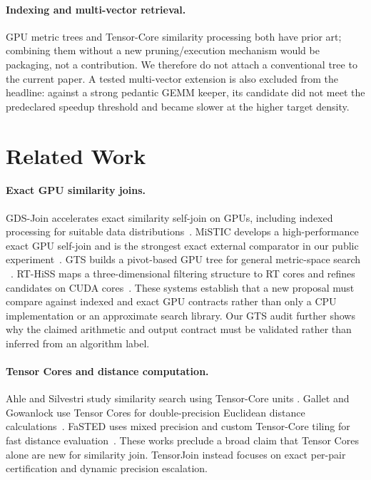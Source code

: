 \documentclass[sigconf,review,anonymous]{acmart}
\newcommand{\system}{TensorJoin\xspace}
\begin{document}
\paragraph{Indexing and multi-vector retrieval.}
GPU metric trees and Tensor-Core similarity processing both have prior art;
combining them without a new pruning/execution mechanism would be packaging,
not a contribution.  We therefore do not attach a conventional tree to the
current paper.  A tested multi-vector extension is also excluded from the
headline: against a strong pedantic GEMM keeper, its candidate did not meet the
predeclared speedup threshold and became slower at the higher target density.

\section{Related Work}

\paragraph{Exact GPU similarity joins.}
GDS-Join accelerates exact similarity self-join on GPUs, including indexed
processing for suitable data distributions~\cite{gowanlock2019gpuselfjoin}.
MiSTIC develops a high-performance exact GPU self-join and is the strongest
exact external comparator in our public experiment~\cite{donnelly2024mistic}.
GTS builds a pivot-based GPU tree for general metric-space search
~\cite{zhu2024gts}.  RT-HiSS maps a three-dimensional filtering structure to
RT cores and refines candidates on CUDA cores~\cite{munugala2026rthiss}.
These systems establish that a new proposal must compare against indexed and
exact GPU contracts rather than only a CPU implementation or an approximate
search library.  Our GTS audit further shows why the claimed arithmetic and
output contract must be validated rather than inferred from an algorithm label.

\paragraph{Tensor Cores and distance computation.}
Ahle and Silvestri study similarity search using Tensor-Core units
\cite{ahle2020tensorcore}.  Gallet and Gowanlock use Tensor Cores for
double-precision Euclidean distance calculations~\cite{gallet2022distance}.
FaSTED uses mixed precision and custom Tensor-Core tiling for fast distance
evaluation~\cite{curless2025fasted}.  These works preclude a broad claim that
Tensor Cores alone are new for similarity join.  \system instead focuses on
exact per-pair certification and dynamic precision escalation.
\end{document}
